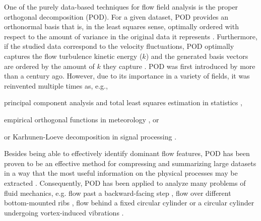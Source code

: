 One of the purely data-based techniques for flow field analysis is the proper orthogonal decomposition (POD). For a given dataset, POD provides an orthonormal basis that is, in the least squares sense, optimally ordered with respect to the amount of variance in the original data it represents \citep{isoz2019}. Furthermore, if the studied data correspond to the velocity fluctuations, POD optimally captures the flow turbulence kinetic energy ($k$) and the generated basis vectors are ordered by the amount of $k$ they capture \citep{taira2020}. POD was first introduced by \citet{Pearson1901} more than a century ago. However, due to its importance in a variety of fields, it was reinvented multiple times as, e.g., 
\begin{inparaenum}[(i)]
        \item principal component analysis \citep{hoetelling1935,jollife2014} and total least squares estimation in statistics \citep{vanHuffel2013,schaffrin2006,leyang2012},
        \item empirical orthogonal functions in meteorology \citep{lorenzxy}, or
        \item or Karhunen-Loeve decomposition in signal processing \citep{karhunen1946,loeve1946}. 
\end{inparaenum}

Besides being able to effectively identify dominant flow features, POD has been proven to be an effective method for compressing and summarizing large datasets in a way that the most useful information on the physical processes may be extracted \citep{kostas2005,feng2010}. Consequently, POD has been applied to analyze many problems of fluid mechanics, e.g. flow past a backward-facing step \citep{kostas2005,kostas2002}, flow over different bottom-mounted ribs \citep{fraga2021}, flow behind a fixed circular cylinder \citep{venturi2006,ma2000,ma2003,feng2010} or a circular cylinder undergoing vortex-induced vibrations \citep{riches2018}.



